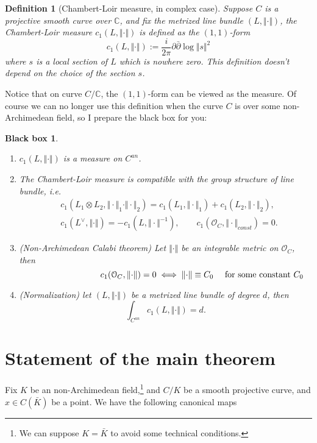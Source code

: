 \documentclass[reqno,11pt]{amsart}
\numberwithin{equation}{section}
\theoremstyle{plain}
\newtheorem{defn}[theorem]{Definition}
\newtheorem*{bbox}{Black box}
\theoremstyle{plain}
\numberwithin{equation}{section}
\theoremstyle{remark}
\newcommand{\norm}[1]{\Vert{#1}\Vert}
\begin{document}
\begin{defn}[Chambert-Loir measure, in complex case]
Suppose $C$ is a projective smooth curve over $\mathbb{C}$, and fix the metrized line bundle $(L,\norm{\cdot})$, the Chambert-Loir measure $c_1(L,\norm{\cdot})$ is defined as the $(1,1)$-form
$$c_1(L,\norm{\cdot}):= \frac{i}{2\pi}\partial\bar{\partial} \log \norm{s}^2$$
where $s$ is a local section of $L$ which is nowhere zero.  This definition doesn't depend on the choice of the section $s$.
\end{defn}
Notice that on curve $C/\mathbb{C}$, the $(1,1)$-form can be viewed as the measure. Of course we can no longer use this definition when the curve $C$ is over some non-Archimedean field, so I prepare the black box for you:
\begin{bbox}\
\begin{enumerate}[(1)]
\item $c_1(L,\norm{\cdot})$ is a measure on $C^{an}$.
\item The Chambert-Loir measure is compatible with the group structure of line bundle, i.e.
\begin{equation*}
\begin{aligned}
  &c_1(L_1\otimes L_2,\norm{\cdot}_1\cdot \norm{\cdot}_2)=c_1(L_1,\norm{\cdot}_1)+c_1(L_2,\norm{\cdot}_2),  \\
   &c_1(L^{\vee},\norm{\cdot})=-c_1(L,\norm{\cdot}^{-1}),\quad\quad c_1(\mathcal{O}_C,\norm{\cdot}_{const})=0.
\end{aligned}
\end{equation*}
\item (Non-Archimedean Calabi theorem) Let $\norm{\cdot}$ be an integrable metric on $\mathcal{O}_C$, then
$$c_1(\mathcal{O}_C,\norm{\cdot})=0 \iff \norm{\cdot} \equiv C_0 \quad \text{ for some constant $C_0$}\hspace{-3cm}$$
\item (Normalization) let $(L,\norm{\cdot})$ be a metrized line bundle of degree $d$, then
$$\int_{C^{an}} c_1(L,\norm{\cdot})=d.$$
\end{enumerate}
\end{bbox}
\section{Statement of the main theorem}
Fix $K$ be an non-Archimedean field,\footnote{We can suppose $K=\bar{K}$ to avoid some technical conditions.} and $C/K$ be a smooth projective curve, and $x\in C(\bar{K})$ be a point. We have the following canonical maps
\end{document}
